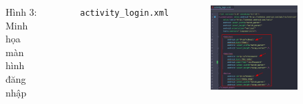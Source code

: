 \documentclass{beamer}
\begin{document}
\begin{frame}
\begin{columns}
\begin{figure}
            \caption{\centering\tiny{Hình 3: Minh họa màn hình đăng nhập}}
        \end{figure}
        \indent \texttt{activity\_login.xml}
        \begin{figure}
            \centering
            \includegraphics[width=\textwidth]{images/28.png}
        \end{figure}
    \end{columns}
\end{frame}
\end{document}
